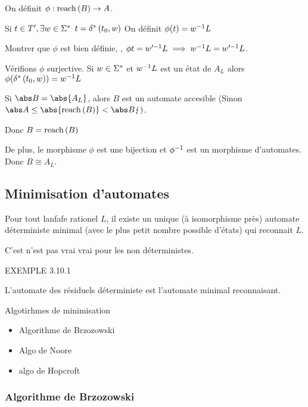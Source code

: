 \begin{exercice}
	On définit $\phi : \text{reach}\left(B\right) \to A$.

	Si $t \in T', \exists w \in \Sigma^{*}$ \tq $ t = \delta^{*} \left(t_0,w\right)$
	On définit $\phi (t) = w^{-1} L$

	Montrer que $\phi$ est bien définie, \ie, $\phi t = w'^{-1} L \implies w^{-1} L = w'^{-1} L$.

	Vérifions $\phi$ surjective. Si $w \in \Sigma^{*}$ et $w^{-1} L$ est un état de $A_L$ alors $\phi (\delta^{*} \left(t_0,w\right)) = w^{-1} L$

	Si $\abs B = \abs {A_L}$, alors $B$ est un automate accesible
	(Sinon $\abs A \leq \abs {\reach B} < \abs B \lightning)$.

	Donc $B = \text{reach}\left(B\right)$

	De plus, le morphisme $\phi$ est une bijection et $\phi^{-1}$ est un morphisme d'automates.
	Donc $B \cong A_L$.

\end{exercice}


\subsection{Minimisation d'automates}

\begin{rappel}
	Pour tout lanfafe rationel $L$, il existe un unique (à isomorphisme près) automate déterministe minimal
	(avec le plus petit nombre possible d'états) qui reconnait $L$.
\end{rappel}

\begin{remarque}
	C'est n'est pas vrai vrai pour les non déterministes.

	EXEMPLE 3.10.1
\end{remarque}

L'automate des résiduels déterministe est l'automate minimal reconnaisant.


Algotirhmes de minimisation
\begin{itemize}
	\item Algorithme de Brzozowski
	\item Algo de Noore
	\item algo de Hopcroft
\end{itemize}


\subsubsection{Algorithme de Brzozowski}

